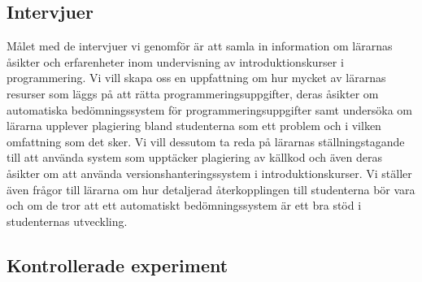 \documentclass[a4paper,11pt]{article}
\begin{document}
{\subsection{Intervjuer}

Målet med de intervjuer vi genomför är att samla in information om lärarnas åsikter och erfarenheter inom undervisning av introduktionskurser i programmering. Vi vill skapa oss en uppfattning om hur mycket av lärarnas resurser som läggs på att rätta programmeringsuppgifter, deras åsikter om automatiska bedömningssystem för programmeringsuppgifter samt undersöka om lärarna upplever plagiering bland studenterna som ett problem och i vilken omfattning som det sker. Vi vill dessutom ta reda på lärarnas ställningstagande till att använda system som upptäcker plagiering av källkod och även deras åsikter om att använda versionshanteringssystem i introduktionskurser. Vi ställer även frågor till lärarna om hur detaljerad återkopplingen till studenterna bör vara och om de tror att ett automatiskt bedömningssystem är ett bra stöd i studenternas utveckling.

\subsection{Kontrollerade experiment}

}
\end{document}
